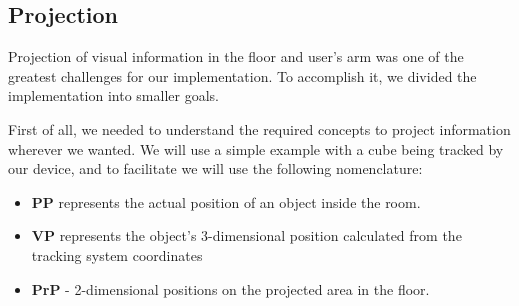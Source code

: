 \subsection{Projection}
\label{prototype-projection}


Projection of visual information in the floor and user's arm was one of the greatest challenges for our implementation. To accomplish it, we divided the implementation into smaller goals.

First of all, we needed to understand the required concepts to project information wherever we wanted. We will use a simple example with a cube being tracked by 
our device, and to facilitate we will use the following nomenclature:

\begin{itemize}
\item \textbf{\ac{PP}} represents the actual position of an object inside the room.
\item \textbf{\ac{VP}} represents the object's 3-dimensional position calculated from the tracking system coordinates
\item \textbf{\ac{PrP}} - 2-dimensional positions on the projected area in the floor.
\end{itemize}





